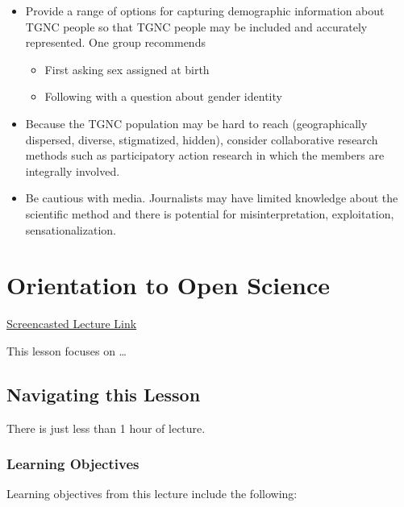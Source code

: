 \documentclass[
  english,
]{book}
\providecommand{\tightlist}{%
  \setlength{\itemsep}{0pt}\setlength{\parskip}{0pt}}
\begin{document}
\begin{itemize}
\tightlist
\item
  Provide a range of options for capturing demographic information about TGNC people so that TGNC people may be included and accurately represented. One group recommends

  \begin{itemize}
  \tightlist
  \item
    First asking sex assigned at birth
  \item
    Following with a question about gender identity
  \end{itemize}
\item
  Because the TGNC population may be hard to reach (geographically dispersed, diverse, stigmatized, hidden), consider collaborative research methods such as participatory action research in which the members are integrally involved.
\item
  Be cautious with media. Journalists may have limited knowledge about the scientific method and there is potential for misinterpretation, exploitation, sensationalization.
\end{itemize}

\hypertarget{OpenScience}{%
\chapter{Orientation to Open Science}\label{OpenScience}}

\href{https://spu.hosted.panopto.com/Panopto/Pages/Viewer.aspx?pid=a46a76d9-1d4f-404c-96e9-ac770016d7db}{Screencasted Lecture Link}

This lesson focuses on \ldots{}

\hypertarget{navigating-this-lesson-7}{%
\section{Navigating this Lesson}\label{navigating-this-lesson-7}}

There is just less than 1 hour of lecture.

\hypertarget{learning-objectives-7}{%
\subsection{Learning Objectives}\label{learning-objectives-7}}

Learning objectives from this lecture include the following:
\end{document}

